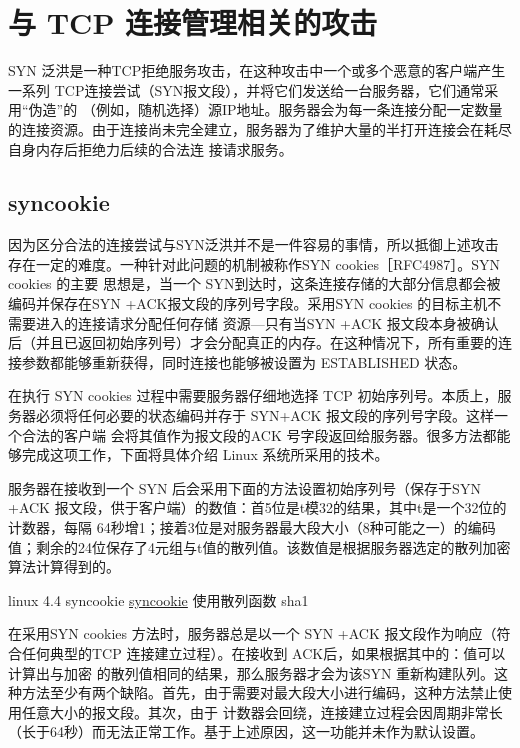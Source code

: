 \section{与 TCP 连接管理相关的攻击}
SYN 泛洪是一种TCP拒绝服务攻击，在这种攻击中一个或多个恶意的客户端产生一系列 TCP连接尝试（SYN报文段），并将它们发送给一台服务器，它们通常采用“伪造”的
（例如，随机选择）源IP地址。服务器会为每一条连接分配一定数量的连接资源。由于连接尚未完全建立，服务器为了维护大量的半打开连接会在耗尽自身内存后拒绝力后续的合法连
接请求服务。

\subsection{syncookie}
因为区分合法的连接尝试与SYN泛洪并不是一件容易的事情，所以抵御上述攻击存在一定的难度。一种针对此问题的机制被称作SYN cookies［RFC4987］。SYN cookies 的主要
思想是，当一个 SYN到达时，这条连接存储的大部分信息都会被编码并保存在SYN +ACK报文段的序列号字段。采用SYN cookies 的目标主机不需要进入的连接请求分配任何存储
资源—只有当SYN +ACK 报文段本身被确认后（并且已返回初始序列号）才会分配真正的内存。在这种情况下，所有重要的连接参数都能够重新获得，同时连接也能够被设置为
ESTABLISHED 状态。

在执行 SYN cookies 过程中需要服务器仔细地选择 TCP 初始序列号。本质上，服务器必须将任何必要的状态编码并存于 SYN+ACK 报文段的序列号字段。这样一个合法的客户端
会将其值作为报文段的ACK 号字段返回给服务器。很多方法都能够完成这项工作，下面将具体介绍 Linux 系统所采用的技术。

服务器在接收到一个 SYN 后会采用下面的方法设置初始序列号（保存于SYN +ACK 报文段，供于客户端）的数值：首5位是t模32的结果，其中t是一个32位的计数器，每隔
64秒增1；接着3位是对服务器最大段大小（8种可能之一）的编码值；剩余的24位保存了4元组与t值的散列值。该数值是根据服务器选定的散列加密算法计算得到的。

\begin{tcolorbox}[title = {Note}]
	linux 4.4 syncookie \href{https://elixir.bootlin.com/linux/v4.4.302/source/net/ipv4/syncookies.c#L108}{syncookie} 使用散列函数 sha1
\end{tcolorbox}

在采用SYN cookies 方法时，服务器总是以一个 SYN +ACK 报文段作为响应（符合任何典型的TCP 连接建立过程）。在接收到 ACK后，如果根据其中的：值可以计算出与加密
的散列值相同的结果，那么服务器才会为该SYN 重新构建队列。这种方法至少有两个缺陷。首先，由于需要对最大段大小进行编码，这种方法禁止使用任意大小的报文段。其次，由于
计数器会回绕，连接建立过程会因周期非常长（长于64秒）而无法正常工作。基于上述原因，这一功能并未作为默认设置。

